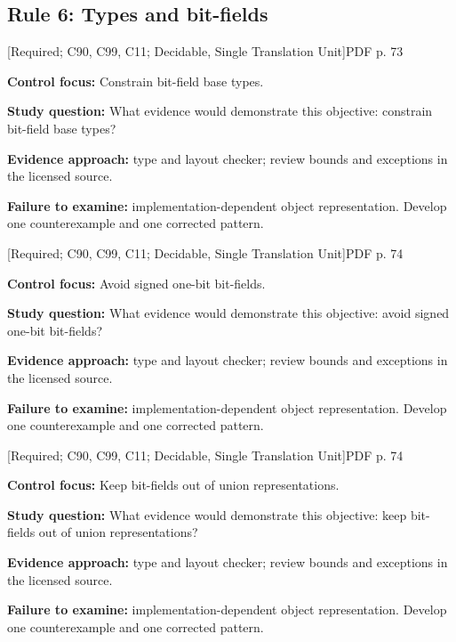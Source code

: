 \documentclass[10pt,letterpaper]{article}
\begin{document}
\subsection{Rule 6: Types and bit-fields}
 \textsf{\footnotesize [Required; C90, C99, C11; Decidable, Single Translation Unit]}\hfill{\footnotesize PDF p. 73}\par
\textbf{Control focus:} Constrain bit-field base types.\par
\textbf{Study question:} What evidence would demonstrate this objective: constrain bit-field base types?\par
\textbf{Evidence approach:} type and layout checker; review bounds and exceptions in the licensed source.\par
\textbf{Failure to examine:} implementation-dependent object representation. Develop one counterexample and one corrected pattern.\par
\smallskip
{}
 \textsf{\footnotesize [Required; C90, C99, C11; Decidable, Single Translation Unit]}\hfill{\footnotesize PDF p. 74}\par
\textbf{Control focus:} Avoid signed one-bit bit-fields.\par
\textbf{Study question:} What evidence would demonstrate this objective: avoid signed one-bit bit-fields?\par
\textbf{Evidence approach:} type and layout checker; review bounds and exceptions in the licensed source.\par
\textbf{Failure to examine:} implementation-dependent object representation. Develop one counterexample and one corrected pattern.\par
\smallskip
{}
 \textsf{\footnotesize [Required; C90, C99, C11; Decidable, Single Translation Unit]}\hfill{\footnotesize PDF p. 74}\par
\textbf{Control focus:} Keep bit-fields out of union representations.\par
\textbf{Study question:} What evidence would demonstrate this objective: keep bit-fields out of union representations?\par
\textbf{Evidence approach:} type and layout checker; review bounds and exceptions in the licensed source.\par
\textbf{Failure to examine:} implementation-dependent object representation. Develop one counterexample and one corrected pattern.\par
\smallskip
\end{document}
